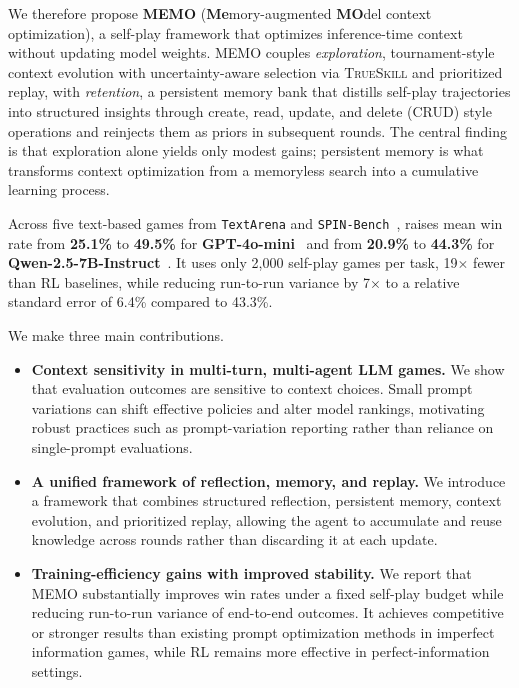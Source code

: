 We therefore propose \textbf{MEMO} (\textbf{Me}mory-augmented \textbf{MO}del context optimization), a self-play framework that optimizes inference-time context without updating model weights. MEMO couples \emph{exploration}, tournament-style context evolution with uncertainty-aware selection via \textsc{TrueSkill} and prioritized replay, with \emph{retention}, a persistent memory bank that distills self-play trajectories into structured insights through create, read, update, and delete (CRUD) style operations and reinjects them as priors in subsequent rounds. The central finding is that exploration alone yields only modest gains; persistent memory is what transforms context optimization from a memoryless search into a cumulative learning process.

Across five text-based games from \texttt{TextArena} and \texttt{SPIN-Bench}~\citep{guertler2025textarena,yao2025spin}, \NAME{} raises mean win rate from \textbf{25.1\%} to \textbf{49.5\%} for \textbf{GPT-4o-mini}~\citep{openai2024gpt4o_mini} and from \textbf{20.9\%} to \textbf{44.3\%} for \textbf{Qwen-2.5-7B-Instruct}~\citep{yang2025qwen2_5}. It uses only 2{,}000 self-play games per task, 19$\times$ fewer than RL baselines, while reducing run-to-run variance by 7$\times$ to a relative standard error of 6.4\% compared to 43.3\%.

We make three main contributions.
\begin{itemize}[leftmargin=1.5em, labelindent=0pt, labelsep=0.5em,topsep=1pt, itemsep=1pt]

  \item \textbf{Context sensitivity in multi-turn, multi-agent LLM games.}
  We show that evaluation outcomes are sensitive to context choices. 
  Small prompt variations can shift effective policies and alter model rankings, motivating robust practices such as prompt-variation reporting rather than reliance on single-prompt evaluations.

  \item \textbf{A unified framework of reflection, memory, and replay.}
  We introduce a framework that combines structured reflection, persistent memory, context evolution, and prioritized replay, allowing the agent to accumulate and reuse knowledge across rounds rather than discarding it at each update.

  \item \textbf{Training-efficiency gains with improved stability.}
  We report that MEMO substantially improves win rates under a fixed self-play budget while reducing run-to-run variance of end-to-end outcomes.
  It achieves competitive or stronger results than existing prompt optimization methods in imperfect information games, while RL remains more effective in perfect-information settings.
\end{itemize}



